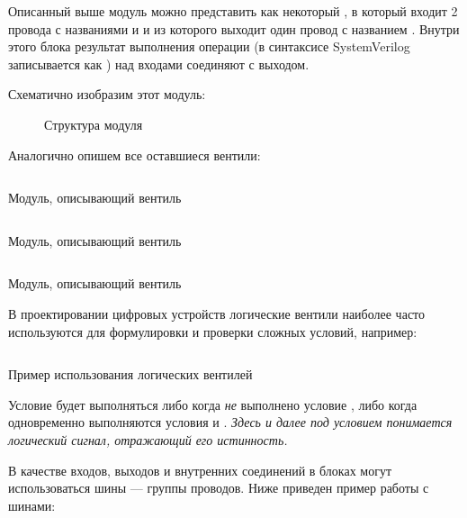 \par{Описанный выше модуль можно представить как некоторый , в который входит 2 провода с названиями \emph{} и \emph{} и из которого выходит один провод с названием \emph{}. Внутри этого блока результат выполнения операции  (в синтаксисе SystemVerilog записывается как \quotes{\&}) над входами соединяют с выходом.}
\par{Схематично изобразим этот модуль:}

\begin{figure}[H]
  \centering
  \def\svgwidth{7cm}
  
  \caption{Структура модуля }
\end{figure}

\par{Аналогично опишем все оставшиеся вентили:}


\begin{listing}[H]
	\inputminted{SystemVerilog}{code_examples/lab_1/or_gate.sv}
	\caption{Модуль, описывающий вентиль }
\end{listing}



\begin{listing}[H]
	\inputminted{SystemVerilog}{code_examples/lab_1/xor_gate.sv}
	\caption{Модуль, описывающий вентиль \mbox{}}
\end{listing}


\begin{listing}[H]
	\inputminted{SystemVerilog}{code_examples/lab_1/not_gate.sv}
	\caption{Модуль, описывающий вентиль }
\end{listing}


\par{В проектировании цифровых устройств логические вентили наиболее часто используются для формулировки и проверки сложных условий, например:}

\begin{listing}[H]
	\inputminted{SystemVerilog}{code_examples/lab_1/logic_gatex_example.sv}
	\caption{Пример использования логических вентилей}
\end{listing}



\par{Условие будет выполняться либо когда \emph{не} выполнено условие \emph{}, либо когда одновременно выполняются условия \emph{} и \emph{}. \emph{Здесь и далее под условием понимается логический сигнал, отражающий его истинность.}}
\par{В качестве входов, выходов и внутренних соединений в блоках могут использоваться шины — группы проводов. Ниже приведен пример работы с шинами:}


